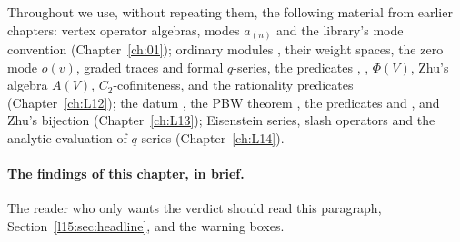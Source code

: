 Throughout we use, without repeating them, the following material from earlier chapters: vertex operator algebras,
modes $a_{(n)}$ and the library's mode convention (Chapter~\ref{ch:01}); ordinary modules , their weight
spaces, the zero mode $o(v)$, graded traces and formal $q$-series, the predicates ,
, $\Phi(V)$, Zhu's algebra $A(V)$, $C_2$-cofiniteness, and the rationality predicates
(Chapter~\ref{ch:L12}); the datum , the PBW theorem , the predicates
 and , and Zhu's bijection (Chapter~\ref{ch:L13}); Eisenstein series,
slash operators and the analytic evaluation of $q$-series (Chapter~\ref{ch:L14}).

\paragraph{The findings of this chapter, in brief.} The reader who only wants the verdict should read this paragraph,
Section~\ref{l15:sec:headline}, and the warning boxes.
